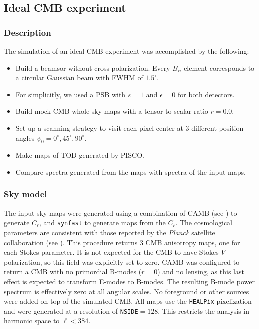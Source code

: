 \documentclass[a4paper,11pt]{article}
\begin{document}
\subsection{Ideal CMB experiment}
\label{subsec::ideal_full_sky}

\subsubsection{Description}

The simulation of an ideal CMB experiment was accomplished by the following:

\begin{itemize}
    \item Build a beamsor without cross-polarization. Every $B_{ii}$ element corresponds to a circular Gaussian beam with FWHM of $1.5^\circ$. 
    \item For simplicitly, we used a PSB with $s=1$ and $\epsilon=0$ for both detectors.
    \item Build mock CMB whole sky maps with a tensor-to-scalar ratio $r=0.0$.
	\item Set up a scanning strategy to visit each pixel center at 3 different position angles $\psi_0 = 0^{\circ},45^{\circ},90^{\circ}$. 
	\item Make maps of TOD generated by PISCO. 
	\item Compare spectra generated from the maps with spectra of the input maps.
\end{itemize}

\subsubsection{Sky model}
\label{subsec::sky_model}

The input sky maps were generated using a combination of CAMB (see \cite{Lewis:2002ah}) to generate $C_\ell$, and \texttt{synfast} to generate maps from the $C_\ell$. The cosmological parameters are consistent with those reported by the \textsl{Planck} satellite collaboration (see \cite{2016A&A...594A..13P}). This procedure returns 3 CMB anisotropy maps, one for each Stokes parameter. It is not expected for the CMB to have Stokes $V$ polarization, so this field was explicitly set to zero. CAMB was configured to return a CMB with no primordial B-modes ($r=0$) and no lensing, as this last effect is expected to transform E-modes to B-modes. The resulting B-mode power spectrum is effectively zero at all angular scales. No foreground or other sources were added on top of the simulated CMB. All maps use the \texttt{HEALPix} pixelization and were generated at a resolution of \texttt{NSIDE}$=128$. This restricts the analysis in harmonic space to $\ell < 384$.
\end{document}
